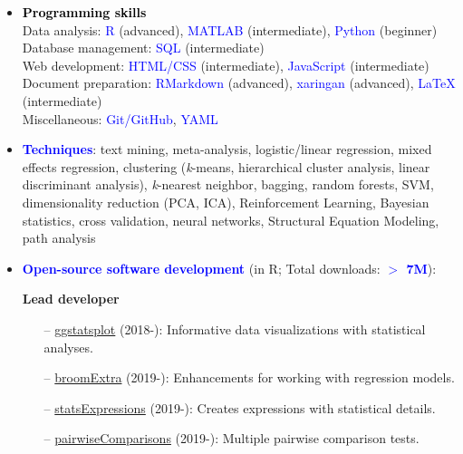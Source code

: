 \documentclass[10pt]{article}
\begin{document}
	\begin{itemize}
	\item \textcolor{black}{\textbf{Programming skills}}\\
	 Data analysis: \textcolor{blue}{R} (advanced), \textcolor{blue}{MATLAB} (intermediate), \textcolor{blue}{Python} (beginner)\\
	 
	 Database management: \textcolor{blue}{SQL} (intermediate)\\
	 
	 Web development: \textcolor{blue}{HTML/CSS} (intermediate), \textcolor{blue}{JavaScript} (intermediate)\\
		Document preparation: \textcolor{blue}{RMarkdown} (advanced), \textcolor{blue}{xaringan} (advanced), \textcolor{blue}{\LaTeX{}} (intermediate)\\
		
	 Miscellaneous: \textcolor{blue}{Git/GitHub}, \textcolor{blue}{YAML} 
	

	\item \textcolor{blue}{\textbf{Techniques}}: text mining, meta-analysis, logistic/linear regression, mixed effects regression, clustering (\textit{k}-means, hierarchical cluster analysis, linear discriminant analysis), \textit{k}-nearest neighbor, bagging, random forests, SVM, dimensionality reduction (PCA, ICA), Reinforcement Learning, Bayesian statistics, cross validation, neural networks, Structural Equation Modeling, path analysis
	
	
	\item \textcolor{blue}{\textbf{Open-source software development}} (in R; Total downloads: \textcolor{blue}{\textbf{$>$ 7M}}):
	 
	 \textbf{Lead developer}
	 
	\begin{itemize}
	
	 \vspace*{-0.09in}
	\itemsep-0.1em
	\item[--] \href{https://indrajeetpatil.github.io/ggstatsplot/}{ggstatsplot} (2018-): Informative data visualizations with statistical analyses.
	\item[--] \href{https://indrajeetpatil.github.io/broomExtra/}{broomExtra} (2019-): Enhancements for working with regression models.
	\item[--] \href{https://indrajeetpatil.github.io/statsExpressions/}{statsExpressions} (2019-): Creates expressions with statistical details.
	\item[--] \href{https://indrajeetpatil.github.io/pairwiseComparisons/}{pairwiseComparisons} (2019-): Multiple pairwise comparison tests.
	

\end{itemize}
\end{itemize}
\end{document}
